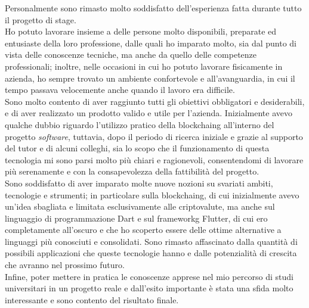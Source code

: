 Personalmente sono rimasto molto soddisfatto dell'esperienza fatta durante tutto il progetto di stage.\\
Ho potuto lavorare insieme a delle persone molto disponibili, preparate ed entusiaste della loro professione, dalle quali ho imparato molto, sia dal punto di vista delle conoscenze tecniche, ma anche da quello delle competenze professionali; inoltre, nelle occasioni in cui ho potuto lavorare fisicamente in azienda, ho sempre trovato un ambiente confortevole e all'avanguardia, in cui il tempo passava velocemente anche quando il lavoro era difficile.\\
Sono molto contento di aver raggiunto tutti gli obiettivi obbligatori e desiderabili, e di aver realizzato un prodotto valido e utile per l'azienda. Inizialmente avevo qualche dubbio riguardo l'utilizzo pratico della \gls{blockchaing} all'interno del progetto \textit{software}, tuttavia, dopo il periodo di ricerca iniziale e grazie al supporto del tutor e di alcuni colleghi, sia lo scopo che il funzionamento di questa tecnologia mi sono parsi molto più chiari e ragionevoli, consentendomi di lavorare più serenamente e con la consapevolezza della fattibilità del progetto.\\
Sono soddisfatto di aver imparato molte nuove nozioni su svariati ambiti, tecnologie e strumenti; in particolare sulla \gls{blockchaing}, di cui inizialmente avevo un'idea sbagliata e limitata esclusivamente alle criptovalute, ma anche sul linguaggio di programmazione Dart e sul \gls{frameworkg} Flutter, di cui ero completamente all'oscuro e che ho scoperto essere delle ottime alternative a linguaggi più conosciuti e consolidati. Sono rimasto affascinato dalla quantità di possibili applicazioni che queste tecnologie hanno e dalle potenzialità di crescita che avranno nel prossimo futuro.\\
Infine, poter mettere in pratica le conoscenze apprese nel mio percorso di studi universitari in un progetto reale e dall'esito importante è stata una sfida molto interessante e sono contento del risultato finale.
